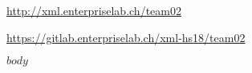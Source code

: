 \documentclass[a4paper]{scrartcl}
\title{\Title}
\date{\Date}
\author{\Author}
\subtitle{$subtitle$}
\begin{document}
\maketitle

\begin{center}
    \url{http://xml.enterpriselab.ch/team02}

    \url{https://gitlab.enterpriselab.ch/xml-hs18/team02}
\end{center}

\vspace{5mm}

\thispagestyle{fancy}

$body$

\end{document}
